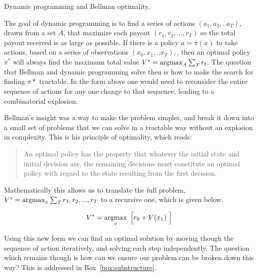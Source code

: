 \begin{featurebox}
	\caption{Dynamic programming and Bellman optimality.}
	\label{box:bellman}
	The goal of dynamic programming is to find a series of actions $(a_1, a_2, ..a_T)$, drawn from a set $A$, that maximize each payout $(r_1, r_2, ..., r_{T})$ so the total payout received is as large as possible. If there is a policy $a = \pi(x)$ to take actions, based on a series of observations $(x_0, x_1, ..x_{T}),$, then an optimal policy $\pi^*$ will always find the maximum total value $V^* = \operatorname*{argmax}_{A} \sum_T r_t $. The question that Bellman and dynamic programming solve then is how to make the search for finding $\pi*$ tractable. In the form above one would need to reconsider the entire sequence of actions for any one change to that sequence, leading to a combinatorial explosion. 
	
	Bellman's insight was a way to make the problem simpler, and break it down into a small set of problems that we can solve in a tractable way without an explosion in complexity. This is his principle of optimality, which reads:

	\begin{quote}
		An optimal policy has the property that whatever the initial state and initial decision are, the remaining decisions must constitute an optimal policy with regard to the state resulting from the first decision. \cite{needed}
	\end{quote}

	Mathematically this allows us to translate the full problem, $V^* = \operatorname*{argmax}_{\pi} \sum_T r_1, r_2, ..., r_{T}$ to a recursive one, which is given below. 

	\begin{equation}
		V^* = \operatorname*{argmax}_{\pi} \ \Big [ r_0 + V(x_1) \ \Big ]
	\end{equation}
	
	Using this new form we can find an optimal solution by moving though the sequence of action iteratively, and solving each step independently. The question which remains though is how can we ensure our problem can be broken down this way? This is addressed in Box~\ref{box:substructure}.
	\medskip
\end{featurebox}

